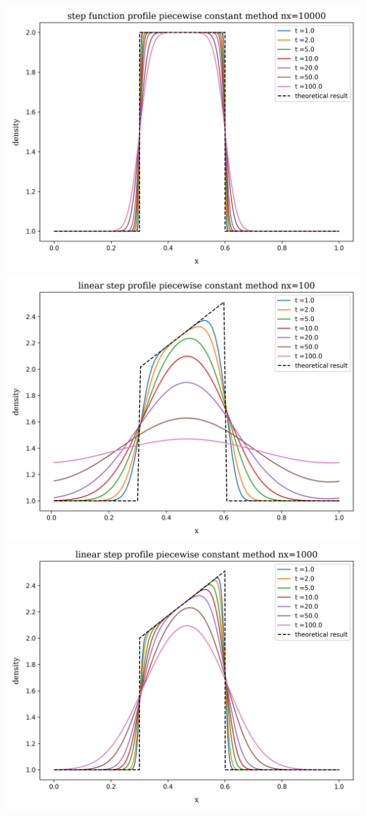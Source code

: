 \begin{frame}
\begin{columns}
			\includegraphics[height=.33\textheight]{../results/1D/pwconst/nx=10000/plot_advection_step_function_pwconst_nx=10000.png}
			\centering
			\includegraphics[height=.33\textheight]{../results/1D/pwconst/nx=100/plot_advection_linear_step_pwconst_nx=100.png}\\
			\includegraphics[height=.33\textheight]{../results/1D/pwconst/nx=1000/plot_advection_linear_step_pwconst_nx=1000.png}\\

\end{columns}
\end{frame}
